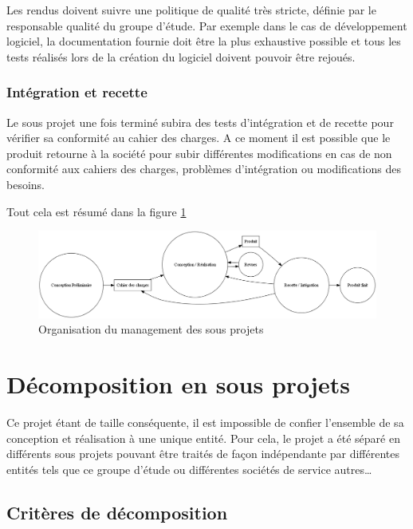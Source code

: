 \documentclass[a4paper, 11pt, draft]{report}
\begin{document}
Les rendus doivent suivre une politique de qualité très stricte, définie par le responsable qualité du groupe d'étude. Par exemple dans le cas de développement logiciel, la documentation fournie doit être la plus exhaustive possible et tous les tests réalisés lors de la création du logiciel doivent pouvoir être rejoués.


\subsection{Intégration et recette}

Le sous projet une fois terminé subira des tests d'intégration et de recette pour vérifier sa conformité au cahier des charges. A ce moment il est possible que le produit retourne à la société pour subir différentes modifications en cas de non conformité aux cahiers des charges, problèmes d'intégration ou modifications des besoins.

Tout cela est résumé dans la figure \ref{glops}


\begin{figure}[htbp]
\begin{center}
\includegraphics[width=\textwidth]{organisation.png}
\caption{Organisation du management des sous projets\label{glops}}
\end{center}
\end{figure}

    
\chapter{Décomposition en sous projets}

Ce projet étant de taille conséquente, il est impossible de confier l'ensemble de sa conception et réalisation à une unique entité. Pour cela, le projet a été séparé en différents sous projets pouvant être traités de façon indépendante par différentes entités tels que ce groupe d'étude ou différentes sociétés de service autres\ldots

\section{Critères de décomposition}
\end{document}

